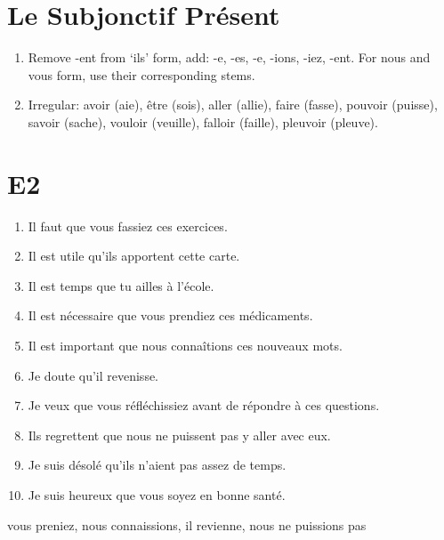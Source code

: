 \documentclass{book}
\begin{document}
    \section{Le Subjonctif Présent}
        \begin{enumerate}
            \item Remove -ent from `ils' form, add: -e, -es, -e, -ions, -iez, -ent. For nous and vous form, use their corresponding stems.
            \item Irregular: avoir (aie), être (sois), aller (allie), faire (fasse), pouvoir (puisse), savoir (sache), vouloir (veuille), falloir (faille), pleuvoir (pleuve).
        \end{enumerate}

    \section{E2}
        \begin{enumerate}
            \item Il faut que vous fassiez ces exercices.
            \item Il est utile qu'ils apportent cette carte.
            \item Il est temps que tu ailles à l'école.
            \item Il est nécessaire que vous prendiez ces médicaments.
            \item Il est important que nous connaîtions ces nouveaux mots.
            \item Je doute qu'il revenisse.
            \item Je veux que vous réfléchissiez avant de répondre à ces questions.
            \item Ils regrettent que nous ne puissent pas y aller avec eux.
            \item Je suis désolé qu'ils n'aient pas assez de temps.
            \item Je suis heureux que vous soyez en bonne santé.
        \end{enumerate}
        vous preniez, nous connaissions, il revienne, nous ne puissions pas
\end{document}

